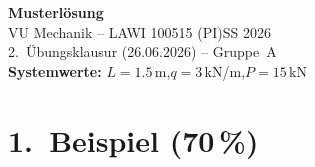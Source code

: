 \documentclass[a4paper,11pt]{article}
\begin{document}

\begin{center}
  {\Large\bfseries Musterlösung}\\[4pt]
  {\large VU Mechanik -- LAWI 100515 (PI)\quad SS 2026}\\[2pt]
  {\normalsize 2.~Übungsklausur (26.06.2026) -- Gruppe~A}\\[2pt]
  {\normalsize \textbf{Systemwerte:} $L = 1.5$\,m,\quad $q = 3$\,kN/m,\quad $P = 15$\,kN}
\end{center}

\section*{1.~Beispiel \hfill (70\,\%)}
\end{document}

